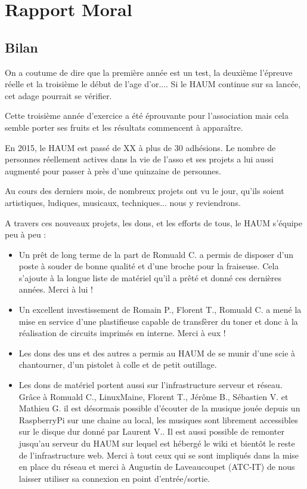 \documentclass[11pt]{article}
\begin{document}
\section{Rapport Moral}


\subsection{Bilan}

On a coutume de dire que la première année est un test, la deuxième l'épreuve réelle et la troisième le début de l'age
d'or.... Si le HAUM continue sur sa lancée, cet adage pourrait se vérifier.

Cette troisième année d'exercice a été éprouvante pour l'association mais cela semble porter ses fruits et les résultats
commencent à apparaître.

En 2015, le HAUM est passé de XX à plus de 30 adhésions. Le nombre de personnes réellement actives dans la vie de l'asso
et ses projets a lui aussi augmenté pour passer à près d'une quinzaine de personnes.

Au cours des derniers mois, de nombreux projets ont vu le jour, qu'ils soient artistiques, ludiques, musicaux,
techniques... nous y reviendrons.

A travers ces nouveaux projets, les dons, et les efforts de tous, le HAUM s'équipe peu à peu :

\begin{itemize}
	\item Un prêt de long terme de la part de Romuald C. a permis de disposer d'un poste à souder de bonne qualité et
		d'une broche pour la fraiseuse. Cela s'ajoute à la longue liste de matériel qu'il a prêté et donné ces dernières
		années. Merci à lui !
	\item Un excellent investissement de Romain P., Florent T., Romuald C. a mené la mise en service d'une plastifieuse
		capable de transfèrer du toner et donc à la réalisation de circuits imprimés en interne. Merci à eux !
	\item Les dons des uns et des autres a permis au HAUM de se munir d'une scie à chantourner, d'un pistolet à colle et
		de petit outillage.
	\item Les dons de matériel portent aussi sur l'infrastructure serveur et réseau. Grâce à Romuald C., LinuxMaine,
		Florent T., Jérôme B., Sébastien V. et Mathieu G. il est désormais possible d'écouter de la musique jouée depuis un
		RaspberryPi sur une chaine au local, les musiques sont librement accessibles sur le disque dur donné par Laurent
		V.. Il est aussi possible de remonter jusqu'au serveur du HAUM sur lequel est hébergé le wiki et bientôt le
		reste de l'infrastructure web. Merci à tout ceux qui se sont impliqués dans la mise en place du réseau et merci
		à Augustin de Laveaucoupet (ATC-IT) de nous laisser utiliser sa connexion en point d'entrée/sortie.
\end{itemize}
\end{document}
